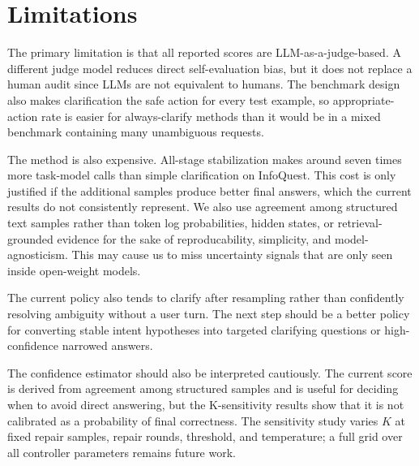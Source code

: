 \section{Limitations}

The primary limitation is that all reported scores are LLM-as-a-judge-based. A different judge model reduces direct self-evaluation bias, but it does not replace a human audit since LLMs are not equivalent to humans. The benchmark design also makes clarification the safe action for every test example, so appropriate-action rate is easier for always-clarify methods than it would be in a mixed benchmark containing many unambiguous requests.

The method is also expensive. All-stage stabilization makes around seven times more task-model calls than simple clarification on InfoQuest. This cost is only justified if the additional samples produce better final answers, which the current results do not consistently represent. We also use agreement among structured text samples rather than token log probabilities, hidden states, or retrieval-grounded evidence for the sake of reproducability, simplicity, and model-agnosticism. This may cause us to miss uncertainty signals that are only seen inside open-weight models.

The current policy also tends to clarify after resampling rather than confidently resolving ambiguity without a user turn. The next step should be a better policy for converting stable intent hypotheses into targeted clarifying questions or high-confidence narrowed answers.

The confidence estimator should also be interpreted cautiously. The current score is derived from agreement among structured samples and is useful for deciding when to avoid direct answering, but the K-sensitivity results show that it is not calibrated as a probability of final correctness. The sensitivity study varies \(K\) at fixed repair samples, repair rounds, threshold, and temperature; a full grid over all controller parameters remains future work.
